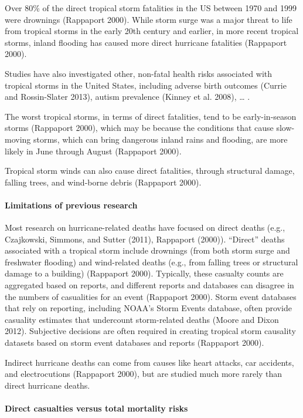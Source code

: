 \documentclass[]{elsarticle} %
\begin{document}
Over 80\% of the direct tropical storm fatalities in the US between 1970
and 1999 were drownings (Rappaport 2000). While storm surge was a major
threat to life from tropical storms in the early 20th century and
earlier, in more recent tropical storms, inland flooding has caused more
direct hurricane fatalities (Rappaport 2000).

Studies have also investigated other, non-fatal health risks associated
with tropical storms in the United States, including adverse birth
outcomes (Currie and Rossin-Slater 2013), autism prevalence (Kinney et
al. 2008), \ldots{} .

The worst tropical storms, in terms of direct fatalities, tend to be
early-in-season storms (Rappaport 2000), which may be because the
conditions that cause slow-moving storms, which can bring dangerous
inland rains and flooding, are more likely in June through August
(Rappaport 2000).

Tropical storm winds can also cause direct fatalities, through
structural damage, falling trees, and wind-borne debris (Rappaport
2000).

\paragraph{Limitations of previous
research}\label{limitations-of-previous-research}

Most research on hurricane-related deaths have focused on direct deaths
(e.g., Czajkowski, Simmons, and Sutter (2011), Rappaport (2000)).
``Direct'' deaths associated with a tropical storm include drownings
(from both storm surge and freshwater flooding) and wind-related deaths
(e.g., from falling trees or structural damage to a building) (Rappaport
2000). Typically, these casualty counts are aggregated based on reports,
and different reports and databases can disagree in the numbers of
casualities for an event (Rappaport 2000). Storm event databases that
rely on reporting, including NOAA's Storm Events database, often provide
casuality estimates that undercount storm-related deaths (Moore and
Dixon 2012). Subjective decisions are often required in creating
tropical storm causality datasets based on storm event databases and
reports (Rappaport 2000).

Indirect hurricane deaths can come from causes like heart attacks, car
accidents, and electrocutions (Rappaport 2000), but are studied much
more rarely than direct hurricane deaths.

\paragraph{Direct casualties versus total mortality
risks}\label{direct-casualties-versus-total-mortality-risks}
\end{document}
